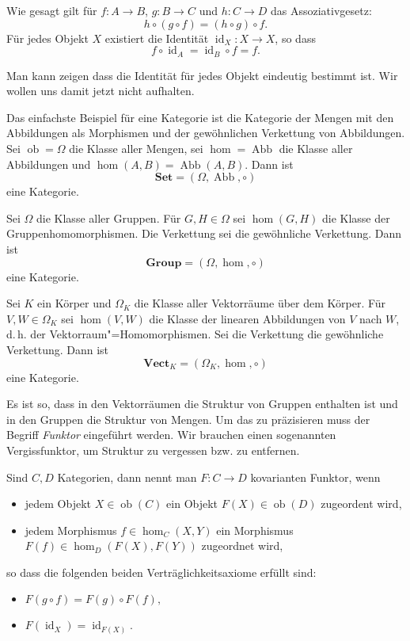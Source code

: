 \documentclass[9pt]{beamer}
\newcommand{\id}{\operatorname{id}}
\newcommand{\Abb}{\operatorname{Abb}}
\newcommand{\ob}{\operatorname{ob}}
\begin{document}
\begin{frame}
Wie gesagt gilt für $f\colon A\to B$, $g\colon B\to C$ und
$h\colon C\to D$ das Assoziativgesetz:
\[h\circ (g\circ f) = (h\circ g)\circ f.\]
Für jedes Objekt $X$ existiert die Identität $\id_X\colon X\to X$, so
dass
\[f\circ\id_A = \id_B\circ f = f.\]
\end{frame}

\begin{frame}
Man kann zeigen dass die Identität für jedes Objekt eindeutig
bestimmt ist. Wir wollen uns damit jetzt nicht aufhalten.
\end{frame}

\begin{frame}
Das einfachste Beispiel für eine Kategorie ist die Kategorie der
Mengen mit den Abbildungen als Morphismen und der gewöhnlichen
Verkettung von Abbildungen.
Sei $\ob=\Omega$ die Klasse aller Mengen, sei $\hom=\Abb$ die Klasse
aller Abbildungen und $\hom(A,B)=\Abb(A,B)$. Dann ist
\[\mathbf{Set} = (\Omega,\Abb,\circ)\]
eine Kategorie.
\end{frame}

\begin{frame}
Sei $\Omega$ die Klasse aller Gruppen. Für $G,H\in\Omega$ sei $\hom(G,H)$
die Klasse der Gruppenhomomorphismen. Die Verkettung sei die
gewöhnliche Verkettung. Dann ist
\[\mathbf{Group} = (\Omega,\hom,\circ)\]
eine Kategorie.
\end{frame}

\begin{frame}
Sei $K$ ein Körper und $\Omega_K$ die Klasse aller Vektorräume
über dem Körper. Für $V,W\in\Omega_K$ sei $\hom(V,W)$ die Klasse
der linearen Abbildungen von $V$ nach $W$, d.\,h. der
Vektorraum"=Homomorphismen. Sei die Verkettung die gewöhnliche
Verkettung. Dann ist
\[\mathbf{Vect}_K = (\Omega_K,\hom,\circ)\]
eine Kategorie.
\end{frame}

\begin{frame}
Es ist so, dass in den Vektorräumen die Struktur von Gruppen
enthalten ist und in den Gruppen die Struktur von Mengen. Um das
zu präzisieren muss der Begriff \emph{Funktor} eingeführt werden. Wir
brauchen einen sogenannten Vergissfunktor, um Struktur zu vergessen
bzw. zu entfernen.
\end{frame}

\begin{frame}
Sind $C,D$ Kategorien, dann nennt man $F\colon C\to D$ kovarianten
Funktor, wenn
\begin{itemize}
\item jedem Objekt $X\in\ob(C)$ ein Objekt $F(X)\in\ob(D)$ zugeordent wird,
\item jedem Morphismus $f\in\hom_C(X,Y)$ ein Morphismus $F(f)\in\hom_D(F(X),F(Y))$
  zugeordnet wird,
\end{itemize}
so dass die folgenden beiden Verträglichkeitsaxiome erfüllt sind:
\begin{itemize}
\item $F(g\circ f) = F(g)\circ F(f),$
\item $F(\id_X) = \id_{F(X)}.$
\end{itemize}
\end{frame}
\end{document}
